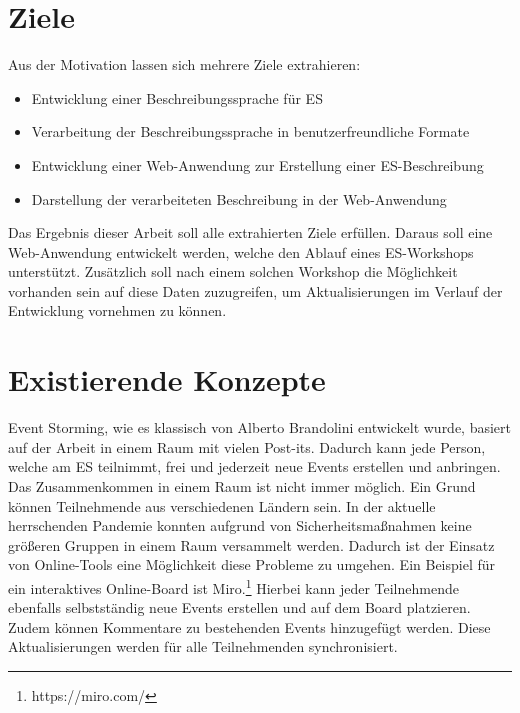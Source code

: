 \section{Ziele}\label{sec:ziele}
Aus der Motivation lassen sich mehrere Ziele extrahieren:

\begin{itemize}
    \item Entwicklung einer Beschreibungssprache für \ac{ES}
    \item Verarbeitung der Beschreibungssprache in benutzerfreundliche Formate
    \item Entwicklung einer Web-Anwendung zur Erstellung einer \ac{ES}-Beschreibung
    \item Darstellung der verarbeiteten Beschreibung in der Web-Anwendung
\end{itemize}

Das Ergebnis dieser Arbeit soll alle extrahierten Ziele erfüllen.
Daraus soll eine Web-Anwendung entwickelt werden, welche den Ablauf eines \ac{ES}-Workshops unterstützt.
Zusätzlich soll nach einem solchen Workshop die Möglichkeit vorhanden sein auf diese Daten zuzugreifen, um Aktualisierungen
im Verlauf der Entwicklung vornehmen zu können.


\section{Existierende Konzepte}\label{sec:existierende-konzepte}
Event Storming, wie es klassisch von Alberto Brandolini entwickelt wurde, basiert auf der Arbeit in einem Raum mit vielen Post-its\textsuperscript{\textregistered}.
Dadurch kann jede Person, welche am \ac{ES} teilnimmt, frei und jederzeit neue Events erstellen und anbringen.
Das Zusammenkommen in einem Raum ist nicht immer möglich.
Ein Grund können Teilnehmende aus verschiedenen Ländern sein.
In der aktuelle herrschenden Pandemie konnten aufgrund von Sicherheitsmaßnahmen keine größeren Gruppen in einem Raum versammelt werden.
Dadurch ist der Einsatz von Online-Tools eine Möglichkeit diese Probleme zu umgehen.
Ein Beispiel für ein interaktives Online-Board ist Miro.\footnote{https://miro.com/}
Hierbei kann jeder Teilnehmende ebenfalls selbstständig neue Events erstellen und auf dem Board platzieren.
Zudem können Kommentare zu bestehenden Events hinzugefügt werden.
Diese Aktualisierungen werden für alle Teilnehmenden synchronisiert.


